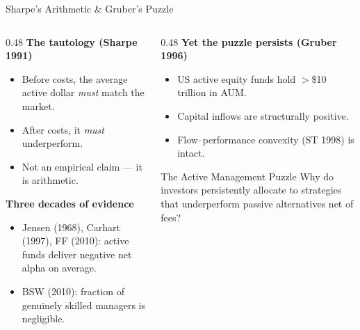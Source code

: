 \documentclass[10pt, aspectratio=169]{beamer}
\begin{document}
\begin{frame}{Sharpe's Arithmetic \& Gruber's Puzzle}
  \begin{columns}[T]
    \begin{column}{0.48\textwidth}
      \textbf{The tautology (Sharpe 1991)}
      \begin{itemize}\itemsep2pt
        \item Before costs, the average active dollar \emph{must} match the market.
        \item After costs, it \emph{must} underperform.
        \item \alert{Not an empirical claim — it is arithmetic.}
      \end{itemize}
      \vspace{4pt}
      \textbf{Three decades of evidence}
      \begin{itemize}\itemsep2pt
        \item Jensen (1968), Carhart (1997), FF (2010): active funds deliver negative net alpha on average.
        \item BSW (2010): fraction of genuinely skilled managers is negligible.
      \end{itemize}
    \end{column}
    \begin{column}{0.48\textwidth}
      \textbf{Yet the puzzle persists (Gruber 1996)}
      \begin{itemize}\itemsep2pt
        \item US active equity funds hold $>$\$10 trillion in AUM.
        \item Capital inflows are structurally positive.
        \item Flow–performance convexity (ST 1998) is intact.
      \end{itemize}
      \vspace{4pt}
      \begin{block}{The Active Management Puzzle}
        \small Why do investors persistently allocate to
        strategies that underperform passive alternatives net of fees?
      \end{block}
    \end{column}
  \end{columns}
\end{frame}
\end{document}
